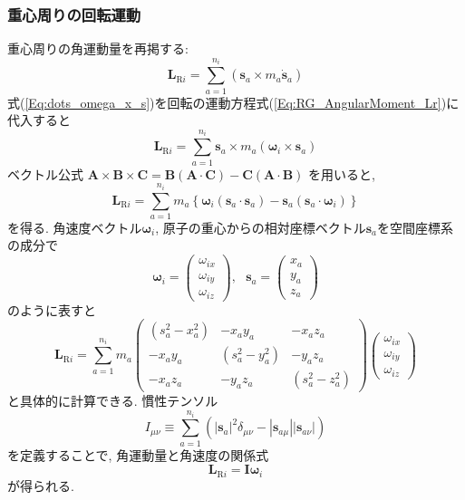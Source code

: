\subsubsection{重心周りの回転運動}
重心周りの角運動量を再掲する:
\begin{equation}
  \bm{L}_{\mathrm{R}i}
  =
  \sum_{a=1}^{n_{i}} (\bm{s}_{a} \times m_{a} \dot{\bm{s}}_{a})
  \label{Eq:RG_AngularMoment_Lr}
\end{equation}
式(\ref{Eq:dots_omega_x_s})を回転の運動方程式(\ref{Eq:RG_AngularMoment_Lr})に代入すると
\begin{equation}
  \bm{L}_{\mathrm{R}i}
  =
  \sum_{a=1}^{n_{i}} \bm{s}_{a} \times m_{a} (\bm{\omega}_{i} \times \bm{s}_{a})
\end{equation}
ベクトル公式
$
  \bm{A} \times \bm{B} \times \bm{C}
  =
  \bm{B}(\bm{A} \cdot \bm{C}) -
  \bm{C}(\bm{A} \cdot \bm{B})
$
を用いると,
\begin{equation}
  \bm{L}_{\mathrm{R}i}
  =
  \sum_{a=1}^{n_{i}} m_{a}
  \left\{
    \bm{\omega}_{i} (\bm{s}_{a} \cdot \bm{s}_{a})
    -
    \bm{s}_{a} (\bm{s}_{a} \cdot \bm{\omega}_{i})
  \right\}
\end{equation}
を得る. 
角速度ベクトル$\bm{\omega}_{i}$, 原子の重心からの相対座標ベクトル$\bm{s}_{a}$を空間座標系の成分で
\begin{equation}
  \bm{\omega}_{i}
  =
  \begin{pmatrix}
    \omega_{ix} \\ \omega_{iy} \\ \omega_{iz}
  \end{pmatrix},~~~
  \bm{s}_{a}
  =
  \begin{pmatrix}
    x_{a} \\ y_{a} \\ z_{a}
  \end{pmatrix}
\end{equation}
のように表すと
\begin{equation}
  \bm{L}_{\mathrm{R}i}
  =
  \sum_{a=1}^{n_{i}} m_{a}
  \begin{pmatrix}
    (s_{a}^{2} - x_{a}^{2}) &
    -x_{a} y_{a} &
    -x_{a} z_{a}  \\
    -x_{a} y_{a} &
    (s_{a}^{2} - y_{a}^{2}) &
    -y_{a} z_{a} \\
    -x_{a} z_{a} &
    -y_{a} z_{a} &
    (s_{a}^{2} - z_{a}^{2})
  \end{pmatrix}
  \begin{pmatrix}
    \omega_{ix} \\ \omega_{iy} \\ \omega_{iz}
  \end{pmatrix}
\end{equation}
と具体的に計算できる. 慣性テンソル
\begin{equation}
  I_{\mu\nu}
  \equiv
  \sum_{a=1}^{n_{i}}
  ( |\bm{s}_{a}|^{2} \delta_{\mu \nu} - |\bm{s}_{a\mu}| |\bm{s}_{a\nu}|)
\end{equation}
を定義することで, 角運動量と角速度の関係式
\begin{equation}
  \bm{L}_{\mathrm{R}i}
  =
  \bm{I} \bm{\omega}_{i}
\end{equation}
が得られる.

